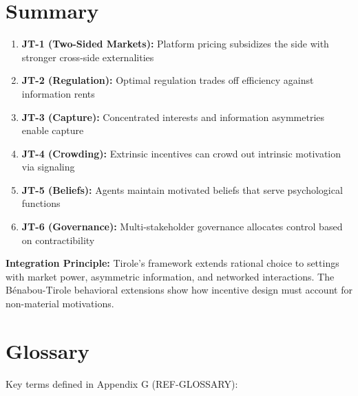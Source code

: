 \section{Summary}
\label{sec:jt-summary}

\begin{tcolorbox}[colback=blue!5!white,colframe=blue!75!black,title=Key Takeaways]
\begin{enumerate}
    \item \textbf{JT-1 (Two-Sided Markets):} Platform pricing subsidizes the side with stronger cross-side externalities
    \item \textbf{JT-2 (Regulation):} Optimal regulation trades off efficiency against information rents
    \item \textbf{JT-3 (Capture):} Concentrated interests and information asymmetries enable capture
    \item \textbf{JT-4 (Crowding):} Extrinsic incentives can crowd out intrinsic motivation via signaling
    \item \textbf{JT-5 (Beliefs):} Agents maintain motivated beliefs that serve psychological functions
    \item \textbf{JT-6 (Governance):} Multi-stakeholder governance allocates control based on contractibility
\end{enumerate}

\textbf{Integration Principle:} Tirole's framework extends rational choice to settings with market power, asymmetric information, and networked interactions. The Bénabou-Tirole behavioral extensions show how incentive design must account for non-material motivations.
\end{tcolorbox}

\section{Glossary}
\label{sec:jt-glossary}

Key terms defined in Appendix G (REF-GLOSSARY):

